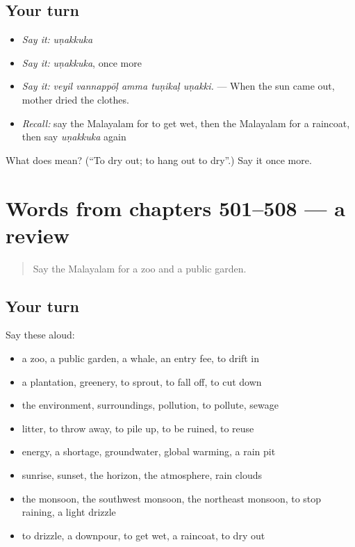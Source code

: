 \subsection*{Your turn}
\begin{itemize}
\raggedright
  \item \emph{Say it:} \emph{uṇakkuka}
  \item \emph{Say it:} \emph{uṇakkuka}, once more
  \item \emph{Say it:} \emph{veyil vannappōḷ amma tuṇikaḷ uṇakki.} — When the sun came out, mother dried the clothes.
  \item \emph{Recall:} say the Malayalam for to get wet, then the Malayalam for a raincoat, then say \emph{uṇakkuka} again
\end{itemize}

\begin{tcolorbox}[breakable,colback=teal!4,colframe=teal!35!black,title={Before you move on}]
What does  mean? (\textquotedblleft{}To dry out; to hang out to dry\textquotedblright{}.) Say it once more.
\end{tcolorbox}
\section[(dialogue)]{Words from chapters 501–508 — a review}

\label{lesson:ML-R508-review-501-508}



\begin{quote}
Say the Malayalam for a zoo and a public garden.
\end{quote}

\subsection*{Your turn}
Say these aloud:

\begin{itemize}
\raggedright
  \item a zoo, a public garden, a whale, an entry fee, to drift in
  \item a plantation, greenery, to sprout, to fall off, to cut down
  \item the environment, surroundings, pollution, to pollute, sewage
  \item litter, to throw away, to pile up, to be ruined, to reuse
  \item energy, a shortage, groundwater, global warming, a rain pit
  \item sunrise, sunset, the horizon, the atmosphere, rain clouds
  \item the monsoon, the southwest monsoon, the northeast monsoon, to stop raining, a light drizzle
  \item to drizzle, a downpour, to get wet, a raincoat, to dry out
\end{itemize}

